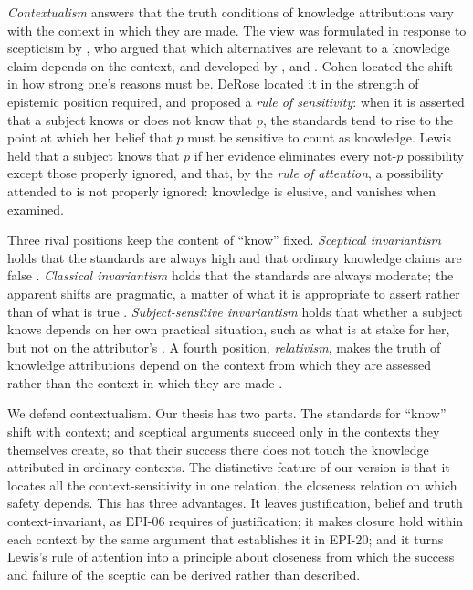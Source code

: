 \documentclass{situationist-preprint}
\begin{document}
\emph{Contextualism} answers that the truth conditions of knowledge attributions vary with the context in which they are made. The view was formulated in response to scepticism by \citet{Stine1976}, who argued that which alternatives are relevant to a knowledge claim depends on the context, and developed by \citet{Cohen1988,Cohen1999}, \citet{DeRose1992,DeRose1995,DeRose2009} and \citet{Lewis1996}. Cohen located the shift in how strong one's reasons must be. DeRose located it in the strength of epistemic position required, and proposed a \emph{rule of sensitivity}: when it is asserted that a subject knows or does not know that $p$, the standards tend to rise to the point at which her belief that $p$ must be sensitive to count as knowledge. Lewis held that a subject knows that $p$ if her evidence eliminates every not-$p$ possibility except those properly ignored, and that, by the \emph{rule of attention}, a possibility attended to is not properly ignored: knowledge is elusive, and vanishes when examined.

Three rival positions keep the content of \enquote{know} fixed. \emph{Sceptical invariantism} holds that the standards are always high and that ordinary knowledge claims are false \citep{Unger1975}. \emph{Classical invariantism} holds that the standards are always moderate; the apparent shifts are pragmatic, a matter of what it is appropriate to assert rather than of what is true \citep{Rysiew2001,Williamson2005}. \emph{Subject-sensitive invariantism} holds that whether a subject knows depends on her own practical situation, such as what is at stake for her, but not on the attributor's \citep{Hawthorne2004,Stanley2005}. A fourth position, \emph{relativism}, makes the truth of knowledge attributions depend on the context from which they are assessed rather than the context in which they are made \citep{MacFarlane2005}.

We defend contextualism. Our thesis has two parts. The standards for \enquote{know} shift with context; and sceptical arguments succeed only in the contexts they themselves create, so that their success there does not touch the knowledge attributed in ordinary contexts. The distinctive feature of our version is that it locates all the context-sensitivity in one relation, the closeness relation on which safety depends. This has three advantages. It leaves justification, belief and truth context-invariant, as EPI-06 requires of justification; it makes closure hold within each context by the same argument that establishes it in EPI-20; and it turns Lewis's rule of attention into a principle about closeness from which the success and failure of the sceptic can be derived rather than described.
\end{document}
